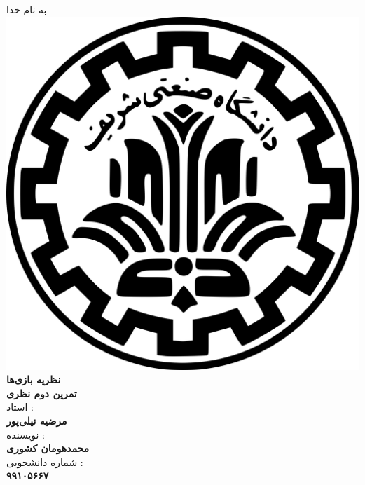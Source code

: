 \begin{center}
    به نام خدا
    \\
    \includegraphics[scale=0.02]{commons/sharif.png}
    \\
    \vspace*{5mm}
    \textbf{\Huge{نظریه بازی‌ها}}
    \hspace*{1mm}
    \vspace*{5mm}
    \\
    \vspace*{5mm}
    \textbf{تمرین دوم نظری}
    \\
    \vspace*{7mm}
    استاد :
    \\
    \vspace*{2mm}
    \textbf{\Large{مرضیه نیلی‌پور}}
    \\
    \vspace*{7mm}
    نویسنده :
    \\
    \vspace*{2mm}
    \textbf{\Large{محمدهومان کشوری}}
    \\
    \vspace*{7mm}
    شماره دانشجویی :
    \\
    \vspace*{2mm}
    \textbf{\Large{۹۹۱۰۵۶۶۷}}
\end{center}